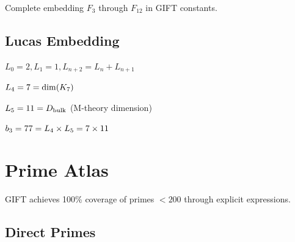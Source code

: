 \begin{theorem}\label{thm:fib_master}
    \leanok
    Complete embedding $F_3$ through $F_{12}$ in GIFT constants.
\end{theorem}

\section{Lucas Embedding}

\begin{definition}\label{def:lucas}
    \leanok
    $L_0 = 2, L_1 = 1, L_{n+2} = L_n + L_{n+1}$
\end{definition}

\begin{theorem}[L4 = dim(K7)]\label{thm:lucas_4_K7}
    \leanok
    $L_4 = 7 = \mathrm{dim}(K_7)$
\end{theorem}

\begin{theorem}[L5 = D\_bulk]\label{thm:lucas_5_bulk}
    \leanok
    $L_5 = 11 = D_{\mathrm{bulk}}$ (M-theory dimension)
\end{theorem}

\begin{theorem}[b3 = L4 * L5]\label{thm:b3_lucas}
    \leanok
    $b_3 = 77 = L_4 \times L_5 = 7 \times 11$
\end{theorem}

\chapter{Prime Atlas}\label{chap:primes}

GIFT achieves 100\% coverage of primes $< 200$ through explicit expressions.

\section{Direct Primes}

